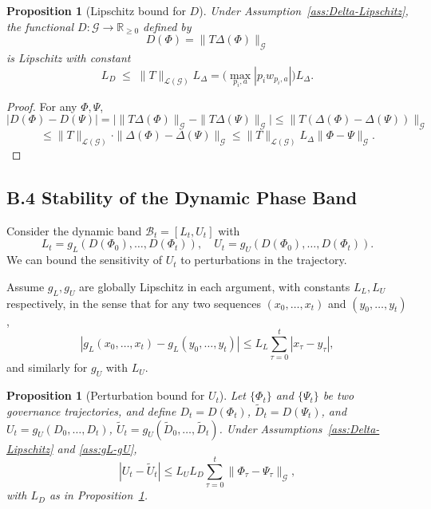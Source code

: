 \documentclass[11pt]{article}
\newtheorem{proposition}[theorem]{Proposition}
\begin{document}
\begin{proposition}[Lipschitz bound for $D$]\label{prop:D-Lipschitz}
Under Assumption~\ref{ass:Delta-Lipschitz}, the functional $D : \mathcal{G} \to \mathbb{R}_{\ge 0}$ defined by
\[
  D(\Phi) = \|T \Delta(\Phi)\|_{\mathcal{G}}
\]
is Lipschitz with constant
\[
  L_D \;\le\; \|T\|_{\mathcal{L}(\mathcal{G})} L_\Delta
  = \Big(\max_{p_i,a} |p_i w_{p_i,a}|\Big) L_\Delta.
\]
\end{proposition}

\begin{proof}
For any $\Phi,\Psi$,
\[
  |D(\Phi) - D(\Psi)|
  = \big|\|T \Delta(\Phi)\|_{\mathcal{G}} - \|T \Delta(\Psi)\|_{\mathcal{G}}\big|
  \le \|T(\Delta(\Phi) - \Delta(\Psi))\|_{\mathcal{G}}
\]
\[
  \le \|T\|_{\mathcal{L}(\mathcal{G})} \cdot \|\Delta(\Phi) - \Delta(\Psi)\|_{\mathcal{G}}
  \le \|T\|_{\mathcal{L}(\mathcal{G})} L_\Delta \|\Phi - \Psi\|_{\mathcal{G}}.
\]
\end{proof}

\subsection{B.4 Stability of the Dynamic Phase Band}

Consider the dynamic band $\mathcal{B}_t = [L_t,U_t]$ with
\[
  L_t = g_L(D(\Phi_0),\dots,D(\Phi_t)),\quad
  U_t = g_U(D(\Phi_0),\dots,D(\Phi_t)).
\]
We can bound the sensitivity of $U_t$ to perturbations in the trajectory.

\begin{assumption}\label{ass:gL-gU}
Assume $g_L,g_U$ are globally Lipschitz in each argument, with constants $L_L,L_U$ respectively, in the sense that for any two sequences $(x_0,\dots,x_t)$ and $(y_0,\dots,y_t)$,
\[
  |g_L(x_0,\dots,x_t) - g_L(y_0,\dots,y_t)|
  \le L_L \sum_{\tau=0}^t |x_\tau - y_\tau|,
\]
and similarly for $g_U$ with $L_U$.
\end{assumption}

\begin{proposition}[Perturbation bound for $U_t$]\label{prop:U-perturb}
Let $\{\Phi_t\}$ and $\{\Psi_t\}$ be two governance trajectories, and define $D_t = D(\Phi_t)$, $\tilde{D}_t = D(\Psi_t)$, and $U_t = g_U(D_0,\dots,D_t)$, $\tilde{U}_t = g_U(\tilde{D}_0,\dots,\tilde{D}_t)$. Under Assumptions~\ref{ass:Delta-Lipschitz} and \ref{ass:gL-gU},
\[
  |U_t - \tilde{U}_t|
  \le
  L_U L_D \sum_{\tau=0}^t \|\Phi_\tau - \Psi_\tau\|_{\mathcal{G}},
\]
with $L_D$ as in Proposition~\ref{prop:D-Lipschitz}.
\end{proposition}
\end{document}
